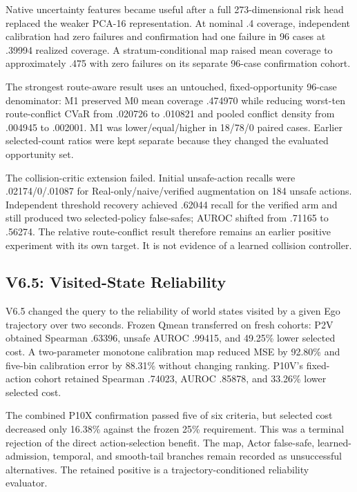 Native uncertainty features became useful after a full 273-dimensional risk head replaced the weaker
PCA-16 representation. At nominal .4 coverage, independent calibration had zero failures and
confirmation had one failure in 96 cases at .39994 realized coverage.
A stratum-conditional map raised mean coverage to approximately .475 with zero failures on its
separate 96-case confirmation cohort.

The strongest route-aware result uses an untouched, fixed-opportunity 96-case denominator:
M1 preserved M0 mean coverage .474970 while reducing worst-ten route-conflict CVaR
from .020726 to .010821 and pooled conflict density from .004945 to .002001.
M1 was lower/equal/higher in 18/78/0 paired cases.
Earlier selected-count ratios were kept separate because they changed the evaluated opportunity set.

The collision-critic extension failed. Initial unsafe-action recalls were .02174/0/.01087 for
Real-only/naive/verified augmentation on 184 unsafe actions.
Independent threshold recovery achieved .62044 recall for the verified arm and still produced two
selected-policy false-safes; AUROC shifted from .71165 to .56274.
The relative route-conflict result therefore remains an earlier positive experiment with its own target.
It is not evidence of a learned collision controller.

\subsection{V6.5: Visited-State Reliability}

V6.5 changed the query to the reliability of world states visited by a given Ego trajectory over two seconds.
Frozen Qmean transferred on fresh cohorts: P2V obtained Spearman .63396, unsafe AUROC .99415,
and 49.25\% lower selected cost.
A two-parameter monotone calibration map reduced MSE by 92.80\% and five-bin calibration error by
88.31\% without changing ranking. P10V's fixed-action cohort retained Spearman .74023,
AUROC .85878, and 33.26\% lower selected cost.

The combined P10X confirmation passed five of six criteria, but selected cost decreased only 16.38\%
against the frozen 25\% requirement. This was a terminal rejection of the direct action-selection benefit.
The map, Actor false-safe, learned-admission, temporal, and smooth-tail branches remain recorded as
unsuccessful alternatives. The retained positive is a trajectory-conditioned reliability evaluator.

